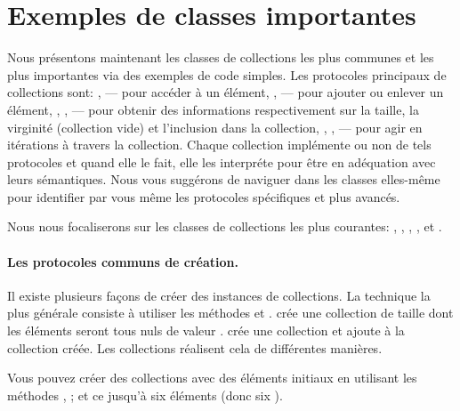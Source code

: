 \documentclass[a4paper,10pt,twoside]{book}
\begin{document}
\section{Exemples de classes importantes}
Nous pr\'esentons maintenant les classes de collections les plus communes et les plus importantes via des exemples de code simples.
Les protocoles principaux de collections sont: ,  --- pour acc\'eder \`a un \'el\'ement, ,  --- pour ajouter ou enlever un \'el\'ement, , ,  --- pour obtenir des informations respectivement sur la taille, la virginit\'e (collection vide) et l'inclusion dans la collection, , ,  --- pour agir en it\'erations \`a travers la collection.
Chaque collection impl\'emente ou non de tels protocoles et quand elle 
le fait, elle les interpr\'ete pour \^etre en ad\'equation avec leurs s\'emantiques.
Nous vous sugg\'erons de naviguer dans les classes elles-m\^eme pour
identifier par vous m\^eme les protocoles sp\'ecifiques et plus
avanc\'es.

Nous nous focaliserons sur les classes de collections les plus courantes:
, , , ,  et .

\paragraph{Les protocoles communs de cr\'eation.}
Il existe plusieurs fa\c{c}ons de cr\'eer des instances de collections.
La technique la plus g\'en\'erale consiste \`a utiliser les m\'ethodes
 et .
 cr\'ee une collection de taille  
dont les \'el\'ements seront tous nuls \cad de valeur . 
  cr\'ee une collection
et ajoute  \`a la collection cr\'e\'ee. 
Les collections r\'ealisent cela de diff\'erentes mani\`eres.

Vous pouvez cr\'eer des collections avec des \'el\'ements initiaux
en utilisant les m\'ethodes \mbox{,}
 \etc; et ce jusqu'\`a 
six \'el\'ements (donc six ).
\end{document}
